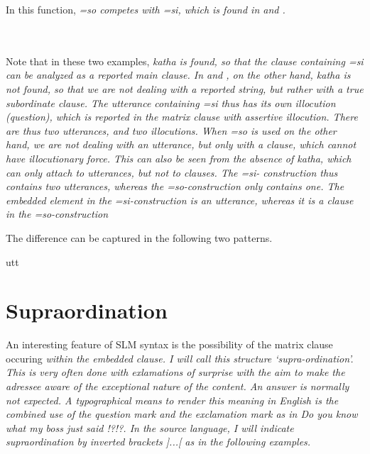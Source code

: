 In this function, \em =so \em competes with \em =si\em, which is found in    and . 

 \\

 \\
Note that in these two examples, \em katha \em is found, so that the clause containing \em =si \em can be analyzed as a reported main clause. In  and , on the other hand, \em katha \em is not found, so that we are not dealing with a reported string, but rather with a true subordinate clause. The utterance containing \em =si \em thus has its own illocution (question), which is reported in the matrix clause with assertive illocution. There are thus two utterances, and two illocutions. When \em =so \em is used on the other hand, we are not dealing with an utterance, but only with a clause, which cannot have illocutionary force. This can also be seen from the absence of \em katha\em, which can only attach to utterances, but not to clauses. The \em =si\em- construction  thus contains two utterances, whereas the \em =so\em-construction only contains one. The embedded element in the \em =si\em-construction is an utterance, whereas it is a clause in the \em =so\em-construction

The difference can be captured in the following two patterns.

{utt}
 

\section{Supraordination}\label{sec:cls:supraordination}
An interesting feature of SLM syntax is the possibility of the matrix clause occuring \em within \em the embedded clause. I will call this structure `supra-ordination'. This is very often done with exlamations of surprise with the aim to make the adressee aware of the exceptional nature of the content. An answer is normally not expected. A typographical means to render this meaning in English is the combined use of the question mark and the exclamation mark as in \em Do you know what my boss just said !?!?\em. In the source language, I will indicate supraordination by inverted brackets ]...[ as in the following examples.

